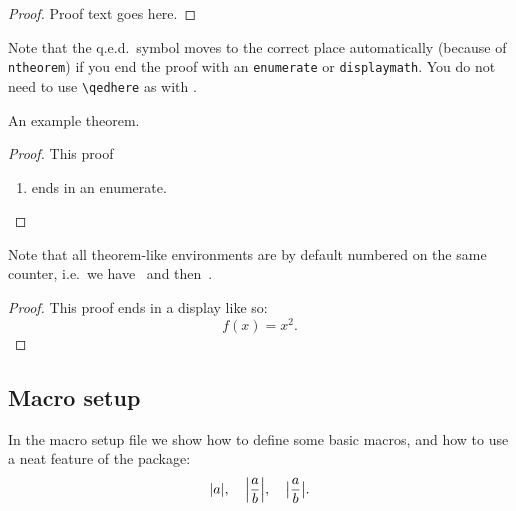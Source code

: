 \begin{proof}
  Proof text goes here.
\end{proof}

Note that the q.e.d.\ symbol moves to the correct place automatically (because of \lstinline|ntheorem|)
if you end the proof with an \texttt{enumerate} or
\texttt{displaymath}.  You do not need to use \verb-\qedhere- as with
.

\begin{theorem}\label{theorem:example}
  An example theorem.
\end{theorem}

\begin{proof}
  This proof
  \begin{enumerate}
  \item ends in an enumerate.
  \end{enumerate}
\end{proof}

\begin{proposition}
  Note that all theorem-like environments are by default numbered on
  the same counter, i.e.\ we have~ and then~.
\end{proposition}

\begin{proof}
  This proof ends in a display like so:
  \begin{displaymath}
    f(x) = x^2.
  \end{displaymath}
\end{proof}


\subsection{Macro setup}

In the macro setup file we show how to define some basic macros,
and how to use a neat feature of the  package:
\begin{displaymath}
  \abs{a}, \quad \abs*{\frac{a}{b}}, \quad \abs[\big]{\frac{a}{b}}.
\end{displaymath}

